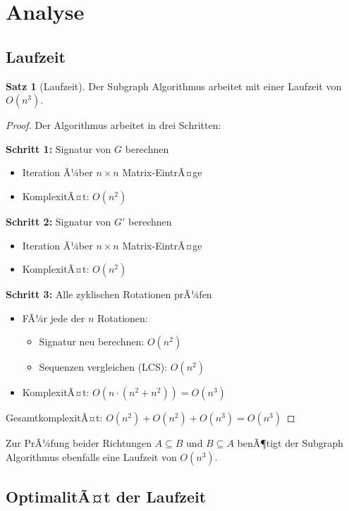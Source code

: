 ﻿\documentclass[a4paper,12pt]{article}
\theoremstyle{definition}
\newtheorem{satz}{Satz}
\begin{document}
\section{Analyse}

\subsection{Laufzeit}

\begin{satz}[Laufzeit]
	Der Subgraph Algorithmus arbeitet mit einer Laufzeit von $O(n^3)$.
\end{satz}

\begin{proof}
	Der Algorithmus arbeitet in drei Schritten:
	
	\textbf{Schritt 1:} Signatur von $G$ berechnen
	\begin{itemize}
		\item Iteration Ã¼ber $n \times n$ Matrix-EintrÃ¤ge
		\item KomplexitÃ¤t: $O(n^2)$
	\end{itemize}
	
	\textbf{Schritt 2:} Signatur von $G'$ berechnen
	\begin{itemize}
		\item Iteration Ã¼ber $n \times n$ Matrix-EintrÃ¤ge
		\item KomplexitÃ¤t: $O(n^2)$
	\end{itemize}
	
	\textbf{Schritt 3:} Alle zyklischen Rotationen prÃ¼fen
	\begin{itemize}
		\item FÃ¼r jede der $n$ Rotationen:
		\begin{itemize}
			\item Signatur neu berechnen: $O(n^2)$
			\item Sequenzen vergleichen (LCS): $O(n^2)$
		\end{itemize}
		\item KomplexitÃ¤t: $O(n \cdot (n^2 + n^2)) = O(n^3)$
	\end{itemize}
	
	GesamtkomplexitÃ¤t: $O(n^2) + O(n^2) + O(n^3) = O(n^3)$
\end{proof}

Zur PrÃ¼fung beider Richtungen $A \subseteq B$ und $B \subseteq A$ benÃ¶tigt der Subgraph Algorithmus ebenfalls eine Laufzeit von $O(n^3)$.

\subsection{OptimalitÃ¤t der Laufzeit}
\end{document}
